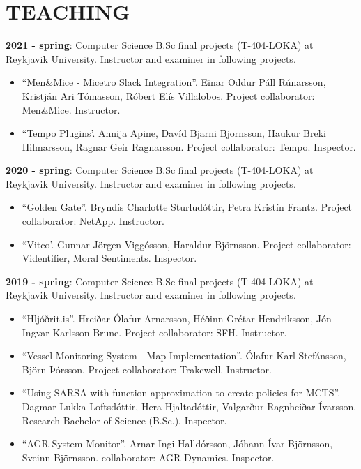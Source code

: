 \section{TEACHING}
\textbf{2021 - spring}:
Computer Science B.Sc final projects (T-404-LOKA) at Reykjavik University.
Instructor and examiner in following projects.

\begin{itemize}
\item ``Men\&Mice - Micetro Slack Integration''. Einar Oddur Páll Rúnarsson, Kristján Ari Tómasson, Róbert Elís Villalobos. Project collaborator: Men\&Mice. Instructor.

\item ``Tempo Plugins'. Annija Apine, Davíd Bjarni Bjornsson, Haukur Breki Hilmarsson, Ragnar Geir Ragnarsson. Project collaborator: Tempo. Inspector.
\end{itemize}

\textbf{2020 - spring}:
Computer Science B.Sc final projects (T-404-LOKA) at Reykjavik University.
Instructor and examiner in following projects.

\begin{itemize}
\item ``Golden Gate''. Bryndís Charlotte Sturludóttir, Petra Kristín Frantz.
    Project collaborator: NetApp. Instructor.

\item ``Vitco'. Gunnar Jörgen Viggósson, Haraldur Björnsson. Project collaborator: Videntifier, Moral Sentiments. Inspector.
\end{itemize}

\textbf{2019 - spring}:
Computer Science B.Sc final projects (T-404-LOKA) at Reykjavik University.
Instructor and examiner in following projects.

\begin{itemize}
\item ``Hljóðrit.is''. Hreiðar Ólafur Arnarsson, Héðinn Grétar Hendriksson, Jón
    Ingvar Karlsson Brune. Project collaborator: SFH. Instructor.

\item ``Vessel Monitoring System - Map Implementation''. Ólafur Karl Stefánsson,
	Björn Þórsson. Project collaborator: Trakcwell. Instructor.

\item ``Using SARSA with function approximation to create policies for MCTS''.
	Dagmar Lukka Loftsdóttir, Hera Hjaltadóttir, Valgarður Ragnheiðar Ívarsson.
		Research Bachelor of Science (B.Sc.). Inspector.

\item ``AGR System Monitor''. Arnar Ingi Halldórsson, Jóhann Ívar Björnsson,
    Sveinn Björnsson. collaborator: AGR Dynamics. Inspector.
\end{itemize}

